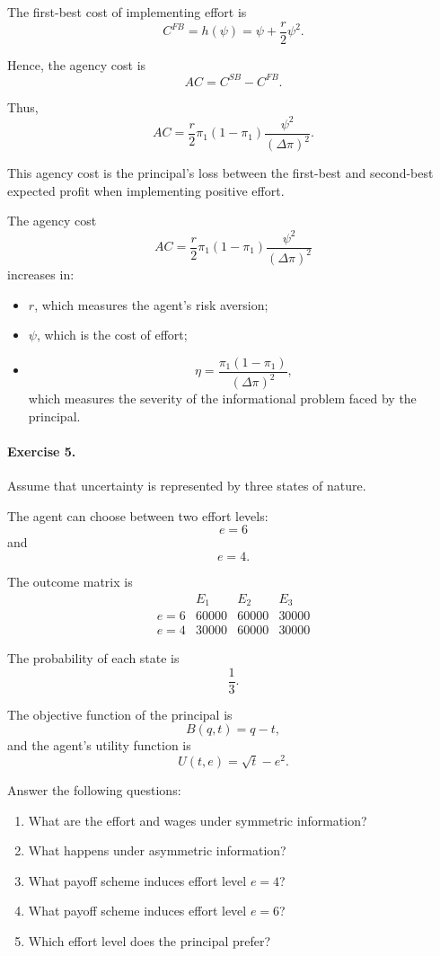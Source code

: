 The first-best cost of implementing effort is
\[
C^{FB}
=
h(\psi)
=
\psi+\frac{r}{2}\psi^2.
\]

Hence, the agency cost is
\[
AC
=
C^{SB}-C^{FB}.
\]

Thus,
\[
AC
=
\frac{r}{2}
\pi_1(1-\pi_1)
\frac{\psi^2}{(\Delta\pi)^2}.
\]

This agency cost is the principal's loss between the first-best and second-best expected profit when implementing positive effort.




The agency cost
\[
AC
=
\frac{r}{2}
\pi_1(1-\pi_1)
\frac{\psi^2}{(\Delta\pi)^2}
\]
increases in:

\begin{itemize}
    \item \(r\), which measures the agent's risk aversion;
    \item \(\psi\), which is the cost of effort;
    \item
    \[
    \eta
    =
    \frac{\pi_1(1-\pi_1)}{(\Delta\pi)^2},
    \]
    which measures the severity of the informational problem faced by the principal.
\end{itemize}

\paragraph{Exercise 5.}

Assume that uncertainty is represented by three states of nature.

The agent can choose between two effort levels:
\[
e=6
\]
and
\[
e=4.
\]

The outcome matrix is
\[
\begin{array}{c|ccc}
 & E_1 & E_2 & E_3 \\
\hline
e=6 & 60000 & 60000 & 30000 \\
e=4 & 30000 & 60000 & 30000
\end{array}
\]

The probability of each state is
\[
\frac{1}{3}.
\]

The objective function of the principal is
\[
B(q,t)=q-t,
\]
and the agent's utility function is
\[
U(t,e)=\sqrt{t}-e^2.
\]

Answer the following questions:

\begin{enumerate}
    \item What are the effort and wages under symmetric information?
    
    \item What happens under asymmetric information?
    
    \item What payoff scheme induces effort level \(e=4\)?
    
    \item What payoff scheme induces effort level \(e=6\)?
    
    \item Which effort level does the principal prefer?
\end{enumerate}

